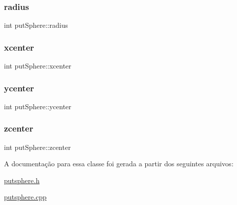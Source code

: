 \subsubsection{\texorpdfstring{radius}{radius}}
{\footnotesize\ttfamily int put\+Sphere\+::radius\hspace{0.3cm}{\ttfamily [protected]}}

\mbox{\label{classput_sphere_ac324eda6406d2ecf5d6c3997a39e829e}} 
\subsubsection{\texorpdfstring{xcenter}{xcenter}}
{\footnotesize\ttfamily int put\+Sphere\+::xcenter\hspace{0.3cm}{\ttfamily [protected]}}

\mbox{\label{classput_sphere_a5f94acbed8bd302faa778dfa360f5eec}} 
\subsubsection{\texorpdfstring{ycenter}{ycenter}}
{\footnotesize\ttfamily int put\+Sphere\+::ycenter\hspace{0.3cm}{\ttfamily [protected]}}

\mbox{\label{classput_sphere_aabacf09086e1296a15409554471ac46f}} 
\subsubsection{\texorpdfstring{zcenter}{zcenter}}
{\footnotesize\ttfamily int put\+Sphere\+::zcenter\hspace{0.3cm}{\ttfamily [protected]}}



A documentação para essa classe foi gerada a partir dos seguintes arquivos\+:\begin{DoxyCompactItemize}
\item 
\mbox{\hyperlink{putsphere_8h}{putsphere.\+h}}\item 
\mbox{\hyperlink{putsphere_8cpp}{putsphere.\+cpp}}\end{DoxyCompactItemize}
